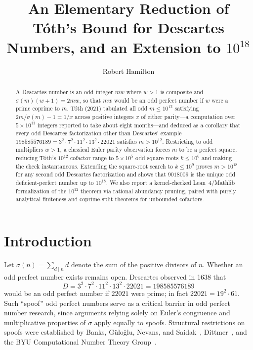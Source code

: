 \documentclass[11pt]{amsart}
\title[An Elementary Reduction of T\'oth's Bound and Extension to $10^{18}$]{An Elementary Reduction of T\'oth's Bound for Descartes Numbers, and an Extension to $10^{18}$}
\author{Robert Hamilton}
\theoremstyle{definition}
\theoremstyle{remark}
\begin{document}
\begin{abstract}
A Descartes number is an odd integer $mw$ where $w > 1$ is composite and $\sigma(m)(w+1) = 2mw$, so that $mw$ would be an odd perfect number if $w$ were a prime coprime to $m$. T\'oth (2021) tabulated all odd $m \le 10^{12}$ satisfying $2m/\sigma(m) - 1 = 1/x$ across positive integers $x$ of either parity---a computation over $5 \times 10^{11}$ integers reported to take about eight months---and deduced as a corollary that every odd Descartes factorization other than Descartes' example $198585576189 = 3^2 \cdot 7^2 \cdot 11^2 \cdot 13^2 \cdot 22021$ satisfies $m > 10^{12}$. Restricting to odd multipliers $w > 1$, a classical Euler parity observation forces $m$ to be a perfect square, reducing T\'oth's $10^{12}$ cofactor range to $5 \times 10^5$ odd square roots $k \le 10^6$ and making the check instantaneous. Extending the square-root search to $k \le 10^9$ proves $m > 10^{18}$ for any second odd Descartes factorization and shows that $9018009$ is the unique odd deficient-perfect number up to $10^{18}$. We also report a kernel-checked Lean~4/Mathlib formalization of the $10^{12}$ theorem via rational abundancy pruning, paired with purely analytical finiteness and coprime-split theorems for unbounded cofactors.
\end{abstract}

\maketitle

\section{Introduction}

Let $\sigma(n) = \sum_{d \mid n} d$ denote the sum of the positive divisors of $n$. Whether an odd perfect number exists remains open. Descartes observed in 1638 that
\[
  D = 3^2 \cdot 7^2 \cdot 11^2 \cdot 13^2 \cdot 22021 = 198585576189
\]
would be an odd perfect number if $22021$ were prime; in fact $22021 = 19^2 \cdot 61$. Such ``spoof'' odd perfect numbers serve as a critical barrier in odd perfect number research, since arguments relying solely on Euler's congruence and multiplicative properties of $\sigma$ apply equally to spoofs. Structural restrictions on spoofs were established by Banks, G\"ulo\u{g}lu, Nevans, and Saidak~\cite{BGNS2008}, Dittmer~\cite{Dittmer2014}, and the BYU Computational Number Theory Group~\cite{BYU2022}.
\end{document}
